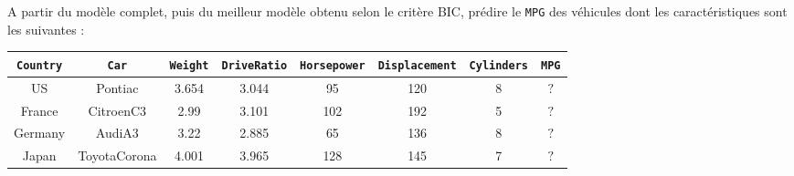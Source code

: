 \documentclass{td_um}
\providecommand{\1}{\mathds{1}}
\begin{document}
 A partir du modèle complet, puis du meilleur modèle obtenu selon le critère BIC, prédire le \texttt{MPG} des véhicules dont les caractéristiques sont les suivantes :
\small{
    \begin{center}
        \begin{tabular}{cccccccc}
            \hline \texttt{Country} & \texttt{Car} & \texttt{Weight} & \texttt{DriveRatio} & \texttt{Horsepower} & \texttt{Displacement} & \texttt{Cylinders} & \texttt{MPG} \\
            \hline\hline US & Pontiac & 3.654 & 3.044 & 95 & 120 & 8 & $?$ \\
            France & CitroenC3 & 2.99 & 3.101 & 102 & 192 & 5 & $?$ \\
            Germany & AudiA3 & 3.22 & 2.885 & 65 & 136 & 8 & $?$ \\
            Japan & ToyotaCorona & 4.001 & 3.965 & 128 & 145 & 7 & $?$ \\
            \hline
        \end{tabular}
    \end{center}
}
\end{document}

